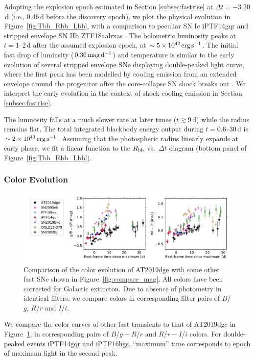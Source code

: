\documentclass[twocolumn]{aastex63}
\begin{document}
\begin{CJK*}{UTF8}{gbsn}
Adopting the explosion epoch estimated in Section \ref{subsec:fastrise} at $\Delta t=-3.20$\,d (i.e., 
0.46\,d before the discovery epoch), we plot the physical evolution in Figure~\ref{fig:Tbb_Rbb_Lbb}, 
with a comparison to peculiar SN Ic iPTF14gqr \citep{De2018} and stripped envelope SN IIb 
ZTF18aalrxas \citep{Fremling2019}. The bolometric luminosity peaks at $ t=1$--2\,d 
after the assumed explosion epoch, at $\sim 5\times 10^{42}\,{\rm erg\, s^{-1}}$. The initial fast drop of 
luminsity ($0.36\,{\rm mag\,d^{-1}}$) and temperature is similar to the early evolution of several 
stripped envelope SNe displaying double-peaked light curve, where the first peak has been modelled 
by cooling emission from an extended envelope around the progenitor after the core-collapse SN 
shock breaks out \citep{Modjaz2019}. We interpret the early evolution in the context of shock-cooling 
emission in Section \ref{subsec:fastrise}.

The lumnosity falls at a much slower rate at later times ($ t \gtrsim 9$\,d) while the radius remains flat. 
The total integrated blackbody energy output during $ t = 0.6$--30\,d is $\sim 
2\times 10^{43}\,{\rm erg\,s^{-1}}$. Assuming that the photospheric radius linearly expands at early 
phase, we fit a linear function to the $R_{\rm bb}$ vs.~$\Delta t$ diagram (bottom panel of 
Figure~\ref{fig:Tbb_Rbb_Lbb}). 

\subsubsection{Color Evolution}
\begin{figure}[htbp!]
	\centering
	\includegraphics[width=\textwidth]{figures/compare_color.pdf}
	\caption{Comparison of the color evolution of AT2019dge with some other fast SNe shown in 
		Figure~\ref{fig:compare_mag}. All colors have been corrected for Galactic extincton. Due to 
		absence of photometry in identical filters, we compare colors in corresponding filter pairs of 
		$B$/$g$, $R$/$r$ and $I$/$i$.  \label{fig:compare_color}}
\end{figure}
We compare the color curves of other fast transients to that of AT2019dge in 
Figure~\ref{fig:compare_color}, in corresponding pairs of $B$/$g-R$/$r$ and $R$/$r-I$/$i$ colors. For 
double-peaked events iPTF14gqr and iPTF16hgs, ``maximum'' time corresponds to epoch of maximum 
light in the second peak.


\end{CJK*}
\end{document}
